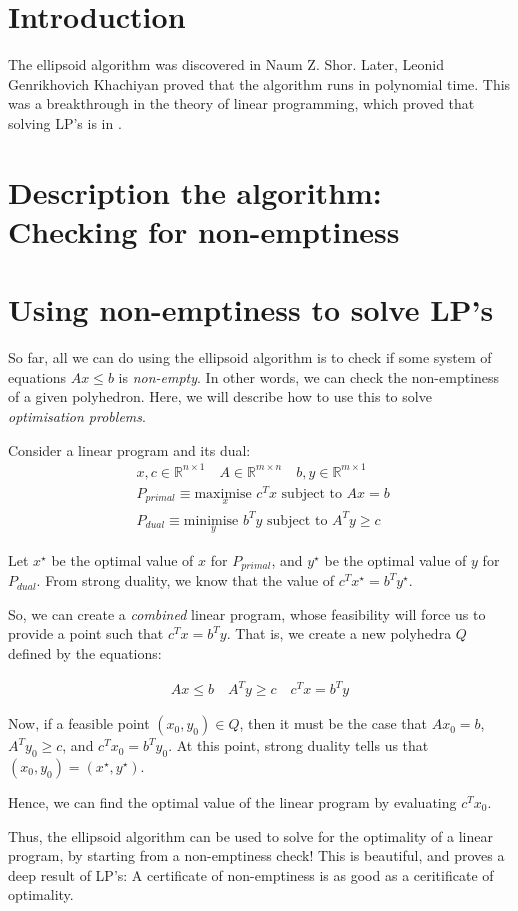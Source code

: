 \documentclass[conference]{IEEEtran}
\begin{document}
\section{Introduction}
The ellipsoid algorithm was discovered in Naum Z. Shor. Later, 
Leonid Genrikhovich Khachiyan proved that the algorithm runs in polynomial
time. This was a breakthrough in the theory of linear programming, which
proved that solving LP's is in \PTIME.

\section{Description the algorithm: Checking for non-emptiness}

\section{Using non-emptiness to solve LP's}
So far, all we can do using the ellipsoid algorithm is to check if some
system of equations $Ax \leq b$ is \textit{non-empty}. In other words, we
can check the non-emptiness of a given polyhedron. Here, we will describe how
to use this to solve \textit{optimisation problems}.

Consider a linear program and its dual:
\begin{align*}
        &x, c \in \mathbb R^{n \times 1} \quad A \in \mathbb R^{m \times n} \quad b, y \in \mathbb R^{m \times 1}\\
        &P_{primal} \equiv \underset{x}{\text{maximise }} c^T x \text{ subject to } Ax = b \\
        &P_{dual} \equiv \underset{y}{\text{minimise }} b^T y \text{ subject to } A^Ty \geq c \quad
\end{align*}

Let $x^\star$ be the optimal value of $x$ for $P_{primal}$, and $y^\star$ be the
optimal value of $y$ for $P_{dual}$. From strong duality, we know that
the value of $c^Tx^\star = b^Ty^\star$.

So, we can create a \textit{combined} linear program, whose feasibility will
force us to provide a point such that $c^Tx = b^T y$. That is, we create
a new polyhedra $Q$ defined by the equations:

\begin{align*}
        A x \leq b \quad
        A^T y \geq c \quad
        c^Tx = b^T y
\end{align*}

Now, if a feasible point $(x_0, y_0) \in Q$, then it must be the case that $Ax_0 = b$,
$A^Ty_0 \geq c$, and $c^Tx_0 = b^Ty_0$. At this point, strong duality tells us that
$(x_0, y_0) = (x^\star, y^\star)$. 

Hence, we can find the optimal value of the linear program by evaluating $c^T x_0$.


Thus, the ellipsoid algorithm can be used to solve for the optimality of a linear
program, by starting from a non-emptiness check! This is beautiful, and proves
a deep result of LP's: A certificate of non-emptiness is as good as a ceritificate
of optimality.



\end{document}
